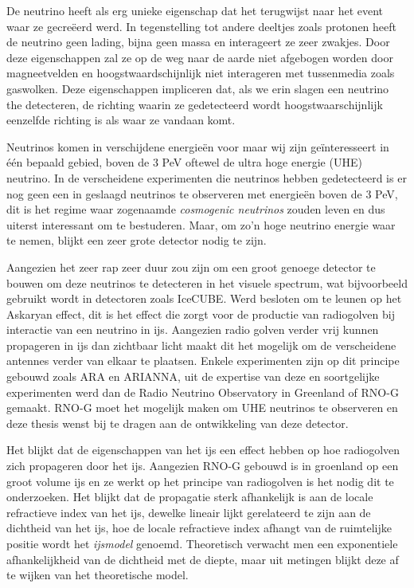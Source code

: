 \documentclass[11pt,a4paper,faculty=we,language=en,doctype=report]{cls/ugent-doc}
\begin{document}
De neutrino heeft als erg unieke eigenschap dat het terugwijst naar het event
waar ze gecreëerd werd. In tegenstelling tot andere deeltjes zoals protonen
heeft de neutrino geen lading, bijna geen massa en interageert ze zeer zwakjes.
Door deze eigenschappen zal ze op de weg naar de aarde niet afgebogen worden 
door magneetvelden en hoogstwaardschijnlijk niet interageren met tussenmedia zoals
gaswolken. Deze eigenschappen impliceren dat, als we erin slagen een neutrino the detecteren, de 
richting waarin ze gedetecteerd wordt hoogstwaarschijnlijk eenzelfde richting is als
waar ze vandaan komt.

Neutrinos komen in verschijdene energieën voor maar wij zijn geïnteresseert in één bepaald gebied,
boven de 3 PeV oftewel de ultra hoge energie (UHE) neutrino. In de verscheidene experimenten die 
neutrinos hebben gedetecteerd is er nog geen een in geslaagd neutrinos te observeren met 
energieën boven de 3 PeV, dit is het regime waar zogenaamde \textit{cosmogenic neutrinos} zouden
leven en dus uiterst interessant om te bestuderen. Maar, om zo'n hoge neutrino energie waar te nemen,
blijkt een zeer grote detector nodig te zijn.

Aangezien het zeer rap zeer duur zou zijn om een groot genoege detector te bouwen om deze neutrinos 
te detecteren in het visuele spectrum, wat bijvoorbeeld gebruikt wordt in detectoren zoals IceCUBE.
Werd besloten om te leunen op het Askaryan effect, dit is het effect die zorgt voor de productie
van radiogolven bij interactie van een neutrino in ijs. Aangezien radio golven verder vrij kunnen
propageren in ijs dan zichtbaar licht maakt dit het mogelijk om de verscheidene antennes verder
van elkaar te plaatsen. Enkele experimenten zijn op dit principe gebouwd zoals ARA en ARIANNA,
uit de expertise van deze en soortgelijke experimenten werd dan de Radio Neutrino Observatory in Greenland of RNO-G gemaakt.
RNO-G moet het mogelijk maken om UHE neutrinos te observeren en deze thesis wenst bij te dragen aan de ontwikkeling
van deze detector.

Het blijkt dat de eigenschappen van het ijs een effect hebben op hoe radiogolven zich propageren door het ijs.
Aangezien RNO-G gebouwd is in groenland op een groot volume ijs en ze werkt op het principe van radiogolven
is het nodig dit te onderzoeken. Het blijkt dat de propagatie sterk afhankelijk is aan de locale refractieve
index van het ijs, dewelke lineair lijkt gerelateerd te zijn aan de dichtheid van het ijs, hoe de locale
refractieve index afhangt van de ruimtelijke positie wordt het \textit{ijsmodel} genoemd. Theoretisch
verwacht men een exponentiele afhankelijkheid van de dichtheid met de diepte, maar uit metingen blijkt deze
af te wijken van het theoretische model. 
\end{document}

